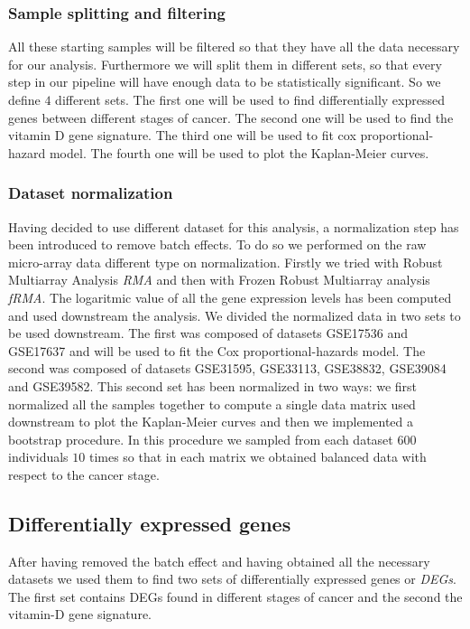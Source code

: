 \documentclass[fleqn,10pt]{SelfArx} %
\begin{document}
		\subsubsection{Sample splitting and filtering}
		All these starting samples will be filtered so that they have all the data necessary for our analysis.
		Furthermore we will split them in different sets, so that every step in our pipeline will have enough data to be statistically significant.
		So we define $4$ different sets.
		The first one will be used to find differentially expressed genes between different stages of cancer.
		The second one will be used to find the vitamin D gene signature.
		The third one will be used to fit cox proportional-hazard model.
		The fourth one will be used to plot the Kaplan-Meier curves.

		\subsubsection{Dataset normalization}
		Having decided to use different dataset for this analysis, a normalization step has been introduced to remove batch effects.
		To do so we performed on the raw micro-array data different type on normalization.
		Firstly we tried with Robust Multiarray Analysis \emph{RMA} and then with Frozen Robust Multiarray analysis \emph{fRMA}.
		The logaritmic value of all the gene expression levels has been computed and used downstream the analysis.
		We divided the normalized data in two sets to be used downstream.
		The first was composed of datasets  GSE17536 and GSE17637 and will be used to fit the Cox proportional-hazards model.
		The second was composed of datasets GSE31595, GSE33113, GSE38832, GSE39084 and GSE39582.
		This second set has been normalized in two ways: we first normalized all the samples together to compute a single data matrix used downstream to plot the Kaplan-Meier curves and then we implemented a bootstrap procedure.
		In this procedure we sampled from each dataset $600$ individuals $10$ times so that in each matrix we obtained balanced data with respect to the cancer stage.

	\subsection{Differentially expressed genes}
	After having removed the batch effect and having obtained all the necessary datasets we used them to find two sets of differentially expressed genes or \emph{DEGs}.
	The first set contains DEGs found in different stages of cancer and the second the vitamin-D gene signature.
\end{document}
